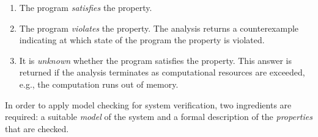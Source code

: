 \documentclass[a4paper, 12pt, twoside]{report}
\begin{document}
	\begin{enumerate}
		\item The program \textit{satisfies} the property.
		\item The program \textit{violates} the property. The analysis returns a counterexample indicating at which state of the program the property is violated. 		
		\item It is \textit{unknown} whether the program satisfies the property. This answer is returned if the analysis terminates as computational resources are exceeded, e.g., the computation runs out of memory.
	\end{enumerate}   

	In order to apply model checking for system verification, two ingredients are required: a suitable \textit{model} of the system and a formal description of the \textit{properties} that are checked. \\
	
\end{document}
